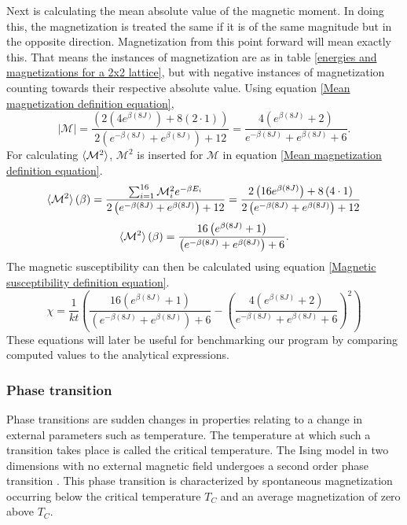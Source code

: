 \documentclass[10pt,a4paper]{article}
\begin{document}
Next is calculating the mean absolute value of the magnetic moment. In doing this, the magnetization is treated the same if it is of the same magnitude but in the opposite direction. Magnetization from this point forward will mean exactly this. That means the instances of magnetization are as in table \ref{energies and magnetizations for a 2x2 lattice}, but with negative instances of magnetization counting towards their respective absolute value. Using equation \ref{Mean magnetization definition equation},
\begin{equation*}
|\mathcal{M}| = \frac{\left( 2\left( 4e^{\beta (8J)} \right) +8\left( 2\cdot1 \right)\right)}{2\left( e^{-\beta (8J)} +e^{\beta (8J)} \right)+12} = \frac{4\left(  e^{\beta (8J)}  +2\right)}{ e^{-\beta (8J)} +e^{\beta (8J)}+6}.
\end{equation*}
For calculating $\braket{\mathcal{M}^2}$, $\mathcal{M}^2$ is inserted for $\mathcal{M}$ in equation \ref{Mean magnetization definition equation}.
\begin{equation*}
\braket{\mathcal{M}^2}(\beta) = \frac{\sum_{i=1}^{16} \mathcal{M}_i^2e^{-\beta E_i}}{2\left( e^{-\beta (8J)} +e^{\beta (8J)} \right)+12}  = \frac{2\left( 16e^{\beta (8J)} \right) +8\left( 4\cdot1 \right)}{2\left( e^{-\beta (8J)} +e^{\beta (8J)} \right)+12}  
\end{equation*}
\begin{equation}
\braket{\mathcal{M}^2}(\beta) = \frac{ 16\left( e^{\beta (8J)}  +1 \right)}{\left( e^{-\beta (8J)} +e^{\beta (8J)} \right)+6}.
\end{equation}
The magnetic susceptibility can then be calculated using equation \ref{Magnetic susceptibility definition equation}.
\begin{equation}
\chi = \frac{1}{kt}\left( \frac{ 16\left( e^{\beta (8J)}  +1 \right)}{\left( e^{-\beta (8J)} +e^{\beta (8J)} \right)+6} - \left( \frac{4\left(  e^{\beta (8J)}  +2\right)}{ e^{-\beta (8J)} +e^{\beta (8J)}+6} \right)^2 \right)
\end{equation}
These equations will later be useful for benchmarking our program by comparing computed values to the analytical expressions.
\subsubsection{Phase transition}
Phase transitions are sudden changes in properties relating to a change in external parameters such as temperature. The temperature at which such a transition takes place is called the critical temperature. The Ising model in two dimensions with no external magnetic field undergoes a second order phase transition \cite{Lecture_Notes_Fall_2015}. This phase transition is characterized by spontaneous magnetization occurring below the critical temperature $T_C$ and an average magnetization of zero above $T_C$\cite{Lecture_Notes_Fall_2015}.
\end{document}
